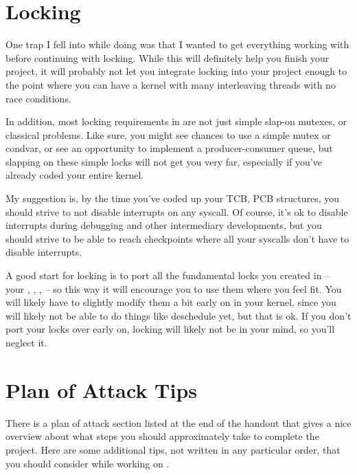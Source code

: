 \documentclass{article}
\begin{document}
\section{Locking}
\label{sec:locking}
One trap I fell into while doing  was that I wanted to get everything working
with  before continuing with locking. While this will
definitely help you finish your project, it will probably not let you integrate locking
into your project enough to the point where you can have a kernel with many interleaving threads 
with no race conditions.

In addition, most locking requirements in  are not just simple slap-on mutexes,
or classical problems. Like sure, you might see chances to use a simple mutex or condvar,
or see an opportunity to implement a producer-consumer queue, but slapping on these
simple locks will not get you very far, especially if you've already coded your entire kernel.

My suggestion is, by the time you've coded up your TCB, PCB structures, you should strive to
not disable interrupts on any syscall. Of course, it's ok to disable interrupts during debugging
and other intermediary developments, but you should strive to be able to reach checkpoints where 
all your syscalls don't have to disable interrupts.

A good start for locking is to port all the fundamental locks you created in  -- your 
, , ,  -- so this way it will encourage you to 
use them where you feel fit. You will likely have to slightly modify them a bit early on in your kernel,
since you will likely not be able to do things like deschedule yet, but that is ok. 
If you don't port your locks over early on, locking will likely not be in your mind,
so you'll neglect it.

\section{Plan of Attack Tips}
There is a plan of attack section listed at the end of the handout that gives
a nice overview about what steps you should approximately take to complete the project.
Here are some additional tips, not written in any particular order, that you should consider
while working on .
\end{document}
